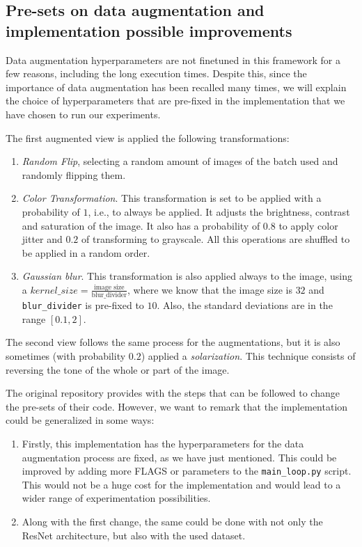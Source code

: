 \subsection{Pre-sets on data augmentation and implementation possible improvements}
\label{byol:preset}

Data augmentation hyperparameters are not finetuned in this framework for a few reasons, including the long execution times. Despite this, since the importance of data augmentation has been recalled many times, we will explain the choice of hyperparameters that are pre-fixed in the implementation that we have chosen to run our experiments.

The first augmented view is applied the following transformations:
\begin{enumerate}
\item \emph{Random Flip}, selecting a random amount of images of the batch used and randomly flipping them.
\item \emph{Color Transformation}. This transformation is set to be applied with a probability of $1$, i.e., to always be applied. It adjusts the brightness, contrast and saturation of the image. It also has a probability of $0.8$ to apply color jitter and $0.2$ of transforming to grayscale. All this operations are shuffled to be applied in a random order.

\item \emph{Gaussian blur}. This transformation is also applied always to the image, using a $kernel\_size = \frac{\text{image size}}{\text{blur\_divider}}$, where we know that the image size is $32$ and \lstinline{blur_divider} is pre-fixed to $10$. Also, the standard deviations are in the range $[0.1,2]$.
\end{enumerate}

The second view follows the same process for the augmentations, but it is also sometimes (with probability $0.2$) applied a \emph{solarization}. This technique consists of reversing the tone of the whole or part of the image.


The original repository provides with the steps that can be followed to change the pre-sets of their code. However, we want to remark that the implementation could be generalized in some ways:
\begin{enumerate}
\item Firstly, this implementation has the hyperparameters for the data augmentation process are fixed, as we have just mentioned. This could be improved by adding more FLAGS or parameters to the \lstinline{main_loop.py} script. This would not be a huge cost for the implementation and would lead to a wider range of experimentation possibilities.

\item Along with the first change, the same could be done with not only the ResNet architecture, but also with the used dataset.
\end{enumerate}

